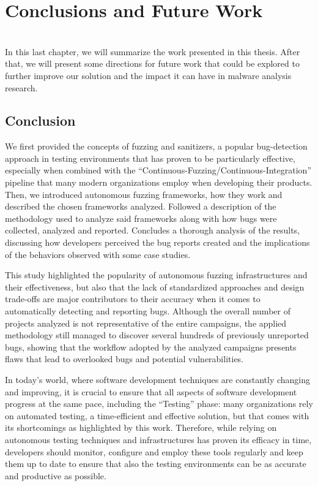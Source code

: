 \chapter{Conclusions and Future Work} \label{chap_5}
\ \\

In this last chapter, we will summarize the work presented in this thesis. After that, we will present some directions for future work that could be explored to further improve our solution and the impact it can have in malware analysis research.

\section{Conclusion}
We first provided the concepts of fuzzing and sanitizers, a popular bug-detection approach in testing environments that has proven to be particularly effective, especially when combined with the ``Continuous-Fuzzing/Continuous-Integration'' pipeline that many modern organizations employ when developing their products. Then, we introduced autonomous fuzzing frameworks, how they work and described the chosen frameworks analyzed. Followed a description of the methodology used to analyze said frameworks along with how bugs were collected, analyzed and reported. Concludes a thorough analysis of the results, discussing how developers perceived the bug reports created and the implications of the behaviors observed with some case studies.

This study highlighted the popularity of autonomous fuzzing infrastructures and their effectiveness, but also that the lack of standardized approaches and design trade-offs are major contributors to their accuracy when it comes to automatically detecting and reporting bugs. Although the overall number of projects analyzed is not representative of the entire campaigns, the applied methodology still managed to discover several hundreds of previously unreported bugs, showing that the workflow adopted by the analyzed campaigns presents flaws that lead to overlooked bugs and potential vulnerabilities.

In today's world, where software development techniques are constantly changing and improving, it is crucial to ensure that all aspects of software development progress at the same pace, including the ``Testing'' phase: many organizations rely on automated testing, a time-efficient and effective solution, but that comes with its shortcomings as highlighted by this work. Therefore, while relying on autonomous testing techniques and infrastructures has proven its efficacy in time, developers should monitor, configure and employ these tools regularly and keep them up to date to ensure that also the testing environments can be as accurate and productive as possible.


